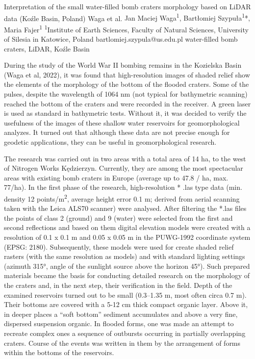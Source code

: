 \abstract
{Interpretation of the small water-filled bomb craters morphology based on LiDAR data (Koźle Basin, Poland)} 
{Waga et al.} 
{Jan Maciej Waga\textsuperscript{1}, Bartłomiej Szypuła\textsuperscript{1}*, Maria Fajer\textsuperscript{1}} 
{\POtag} 
{
		\textsuperscript{1}Institute of Earth Sciences, Faculty of Natural Sciences, University of Silesia in Katowice, Poland
}
{bartlomiej.szypula@us.edu.pl}  %
{water-filled bomb craters, LiDAR, Koźle Basin}
{
During the study of the World War II bombing remains in the Kozielska Basin (Waga et al, 2022), it was found that high-resolution images of shaded relief show the elements of the morphology of the bottom of the flooded craters. Some of the pulses, despite the wavelength of 1064 nm (not typical for bathymetric scanning) reached the bottom of the craters and were recorded in the receiver. A green laser is used as standard in bathymetric tests. Without it, it was decided to verify the usefulness of the images of these shallow water reservoirs for geomorphological analyzes. It turned out that although these data are not precise enough for geodetic applications, they can be useful in geomorphological research.

The research was carried out in two areas with a total area of 14 ha, to the west of Nitrogen Works Kędzierzyn. Currently, they are among the most spectacular areas with existing bomb craters in Europe (average up to 47.8 / ha, max. 77/ha). In the first phase of the research, high-resolution * .las type data (min. density 12 points/m\textsuperscript{2}, average height error 0.1 m; derived from aerial scanning taken with the Leica ALS70 scanner) were analysed. After filtering the *.las files the points of class 2 (ground) and 9 (water) were selected from the first and second reflections and based on them digital elevation models were created with a resolution of 0.1 x 0.1 m and 0.05 x 0.05 m in the PUWG-1992 coordinate system (EPSG: 2180). Subsequently, these models were used for create shaded relief rasters (with the same resolution as models) and with standard lighting settings (azimuth 315°, angle of the sunlight source above the horizon 45°). Such prepared materials became the basis for conducting detailed research on the morphology of the craters and, in the next step, their verification in the field. Depth of the examined reservoirs turned out to be small (0.3--1.35 m, most often circa 0.7 m). Their bottoms are covered with a 5-12 cm thick compact organic layer. Above it, in deeper places a \enquote{soft bottom} sediment accumulates and above a very fine, dispersed suspension organic. In flooded forms, one was made an attempt to recreate complex ones a sequence of outbursts occurring in partially overlapping craters. Course of the events was written in them by the arrangement of forms within the bottoms of the reservoirs. 

}
